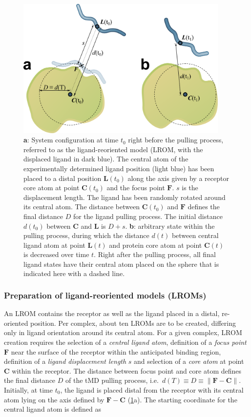 \begin{figure}
\centering
\includegraphics[height=7cm]{gfx/dmd/scheme_geometry_two_panels_002.pdf}
\caption[]{
\textbf{a}: System configuration at time $t_0$ right before the pulling process,
referred to as the ligand-reoriented model (LROM, with the displaced ligand in
dark blue). The central atom of the experimentally determined ligand position
(light blue) has been placed to a distal position $\bm{L}(t_0)$ along the axis
given by a receptor core atom at point $\bm{C}(t_0)$ and the focus point
$\bm{F}$. $s$ is the displacement length. The ligand has been randomly rotated
around its central atom. The distance between $\bm{C}(t_0)$ and $\bm{F}$ defines
the final distance $D$ for the ligand pulling process. The initial distance
$d(t_0)$ between $\bm{C}$ and $\bm{L}$ is $D+s$.
\textbf{b}: arbitrary state within the pulling process, during which the
distance $d(t)$ between central ligand atom at point $\bm{L}(t)$ and protein
core atom at point $\bm{C}(t)$ is decreased over time $t$. Right after the
pulling process, all final ligand states have their central atom placed on the
sphere that is indicated here with a dashed line.
}
\label{fig:dmd:geometry_scheme}
\end{figure}

\subsubsection{Preparation of ligand-reoriented models (LROMs)}
\label{dmd:lrom_preparation}
An LROM contains the receptor as well as the ligand placed in a distal,
re-oriented position. Per complex, about ten LROMs are to be created, differing
only in ligand orientation around its central atom. For a given complex, LROM
creation requires the selection of a \textit{central ligand atom}, definition of
a \textit{focus point} $\bm{F}$ near the surface of the receptor within the
anticipated binding region, definition of a \textit{ligand displacement length}
$s$ and selection of a \textit{core atom} at point $\bm{C}$ within the receptor.
The distance between focus point and core atom defines the final distance $D$ of
the tMD pulling process, i.e.\  $d(T) \equiv D \equiv  \lVert \bm{F}-\bm{C}
\rVert$. Initially, at time $t_0$, the ligand is placed distal from the receptor
with its central atom lying on the axis defined by $\bm{F}-\bm{C}$
(\cref{fig:dmd:geometry_scheme}a). The starting coordinate for the central
ligand atom is defined as

